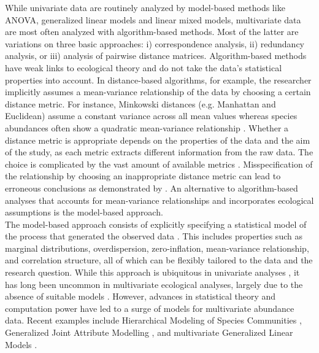 \documentclass[a4paper,11pt]{article}
\begin{document}
    
    While univariate data are routinely analyzed by model-based methods like ANOVA, generalized linear models and linear mixed models, multivariate data are most often analyzed with algorithm-based methods.
    Most of the latter are variations on three basic approaches: i) correspondence analysis, ii) redundancy analysis, or iii) analysis of pairwise distance matrices. 
    Algorithm-based methods have weak links to ecological theory and do not take the data's statistical properties into account. 
    In distance-based algorithms, for example, the researcher implicitly assumes a mean-variance relationship of the data by choosing a certain distance metric. 
	For instance, Minkowski distances (e.g. Manhattan and Euclidean) assume a constant variance across all mean values \citep{TerBraak1988}
	whereas species abundances often show a quadratic mean-variance relationship \citep{routledge1991taylor, yamamura1999transformation}.
	Whether a distance metric is appropriate depends on the properties of the data and the aim of the study, as each metric extracts different information from the raw data. 
	The choice is complicated by the vast amount of available metrics \citep[see][]{Legendre2012}.
	Misspecification of the relationship by choosing an inappropriate distance metric can lead to erroneous conclusions as demonstrated by \citet{Warton2012}.
	An alternative to algorithm-based analyses that accounts for mean-variance relationships and incorporates ecological assumptions is the model-based approach.\\
 


	The model-based approach consists of explicitly specifying a statistical model of the process that generated the observed data \citep{Warton2015a}.
	This includes properties such as marginal distributions, overdispersion, zero-inflation, mean-variance relationship, and correlation structure, all of which can be flexibly tailored to the data and the research question.
	While this approach is ubiquitous in univariate analyses \citep[e.g.][]{bolker2008ecological, zuur2010protocol}, it has long been uncommon in multivariate ecological analyses, largely due to the absence of suitable models \citep{anderson2001new}.
    However, advances in statistical theory and computation power have led to a surge of models for multivariate abundance data. 
	Recent examples include Hierarchical Modeling of Species Communities \citep{Ovaskainen2017}, Generalized Joint 
	Attribute Modelling \citep{Clark2017},  and multivariate Generalized Linear Models \citep[MvGLM,][]{Warton2012}.
	
\end{document}
